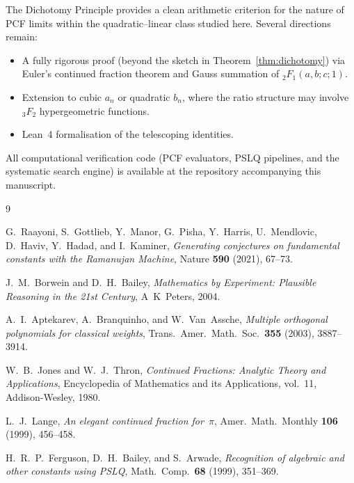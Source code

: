 \documentclass[11pt,a4paper]{article}
\theoremstyle{definition}
\theoremstyle{remark}
\begin{document}
The Dichotomy Principle provides a clean arithmetic criterion
for the nature of PCF limits within the quadratic--linear class
studied here.  Several directions remain:
\begin{itemize}
\item A fully rigorous proof (beyond the sketch in
  Theorem~\ref{thm:dichotomy}) via Euler's continued fraction
  theorem and Gauss summation of ${}_2F_1(a,b;c;1)$.
\item Extension to cubic $a_n$ or quadratic $b_n$, where the ratio
  structure may involve ${}_3F_2$ hypergeometric functions.
\item Lean~4 formalisation of the telescoping identities.
\end{itemize}

All computational verification code (PCF evaluators, PSLQ pipelines,
and the systematic search engine) is available at the
repository accompanying this manuscript.

\begin{thebibliography}{9}

G.~Raayoni, S.~Gottlieb, Y.~Manor, G.~Pisha, Y.~Harris, U.~Mendlovic,
D.~Haviv, Y.~Hadad, and I.~Kaminer,
\emph{Generating conjectures on fundamental constants with the
Ramanujan Machine},
Nature \textbf{590} (2021), 67--73.

J.~M.~Borwein and D.~H.~Bailey,
\emph{Mathematics by Experiment: Plausible Reasoning in the 21st Century},
A~K~Peters, 2004.

A.~I.~Aptekarev, A.~Branquinho, and W.~Van~Assche,
\emph{Multiple orthogonal polynomials for classical weights},
Trans.\ Amer.\ Math.\ Soc.\ \textbf{355} (2003), 3887--3914.

W.~B.~Jones and W.~J.~Thron,
\emph{Continued Fractions: Analytic Theory and Applications},
Encyclopedia of Mathematics and its Applications, vol.~11,
Addison-Wesley, 1980.

L.~J.~Lange,
\emph{An elegant continued fraction for~$\pi$},
Amer.\ Math.\ Monthly \textbf{106} (1999), 456--458.

H.~R.~P.~Ferguson, D.~H.~Bailey, and S.~Arwade,
\emph{Recognition of algebraic and other constants using PSLQ},
Math.\ Comp.\ \textbf{68} (1999), 351--369.

\end{thebibliography}
\end{document}
